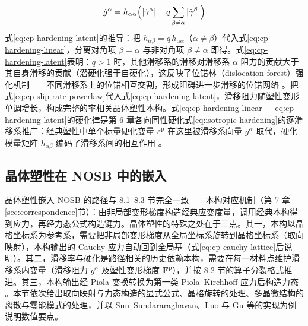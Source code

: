 \begin{equation}
  \dot{g}^{\alpha}=h_{\alpha\alpha}\Bigl(|\dot{\gamma}^{\alpha}|+q\sum_{\beta\neq\alpha}|\dot{\gamma}^{\beta}|\Bigr)
  \label{eq:cp-hardening-latent}
\end{equation}
式\eqref{eq:cp-hardening-latent}的推导：把 $h_{\alpha\beta}=q\,h_{\alpha\alpha}$（$\alpha\neq\beta$）代入式\eqref{eq:cp-hardening-linear}，分离对角项 $\beta=\alpha$ 与非对角项 $\beta\neq\alpha$ 即得。式\eqref{eq:cp-hardening-latent}表明：$q>1$ 时，其他滑移系的滑移对滑移系 $\alpha$ 阻力的贡献大于其自身滑移的贡献（潜硬化强于自硬化），这反映了位错林（dislocation forest）强化机制——不同滑移系上的位错相互交割，形成阻碍进一步滑移的位错网络 \cite{Asaro1983}。把式\eqref{eq:cp-slip-rate-powerlaw}代入式\eqref{eq:cp-hardening-latent}，滑移阻力随塑性变形单调增长，构成完整的率相关晶体塑性本构。式\eqref{eq:cp-hardening-linear}—\eqref{eq:cp-hardening-latent}的硬化律是第 6 章各向同性硬化式\eqref{eq:isotropic-hardening}的逐滑移系推广：经典塑性中单个标量硬化变量 $\bar{\varepsilon}^{\mathrm{p}}$ 在这里被滑移系向量 $g^{\alpha}$ 取代，硬化模量矩阵 $h_{\alpha\beta}$ 编码了滑移系间的相互作用 \cite{Roters2010}。

\subsection{晶体塑性在 NOSB 中的嵌入}\label{sec:cp-nosb}

晶体塑性嵌入 NOSB 的路径与 8.1--8.3 节完全一致——本构对应机制（第 7 章\ref{sec:correspondence}节）：由非局部变形梯度构造经典应变度量，调用经典本构得到应力，再经力态公式构造键力。晶体塑性的特殊之处在于三点。其一，本构以晶格坐标系为参考系，需要把非局部变形梯度从全局坐标系旋转到晶格坐标系（取向映射），本构输出的 Cauchy 应力自动回到全局基（式\eqref{eq:cp-cauchy-lattice}后说明）。其二，滑移率与硬化是路径相关的历史依赖本构，需要在每一材料点维护滑移系内变量（滑移阻力 $g^{\alpha}$ 及塑性变形梯度 $\mathbf{F}^{\mathrm{p}}$），并按 8.2 节的算子分裂格式推进。其三，本构输出经 Piola 变换转换为第一类 Piola--Kirchhoff 应力后构造力态 \cite{SunSundararaghavan2014,Littlewood2011}。本节依次给出取向映射与力态构造的显式公式、晶格旋转的处理、多晶微结构的离散与零能模式的处理，并以 Sun--Sundararaghavan、Luo 与 Gu 等的实现为例说明数值要点。

